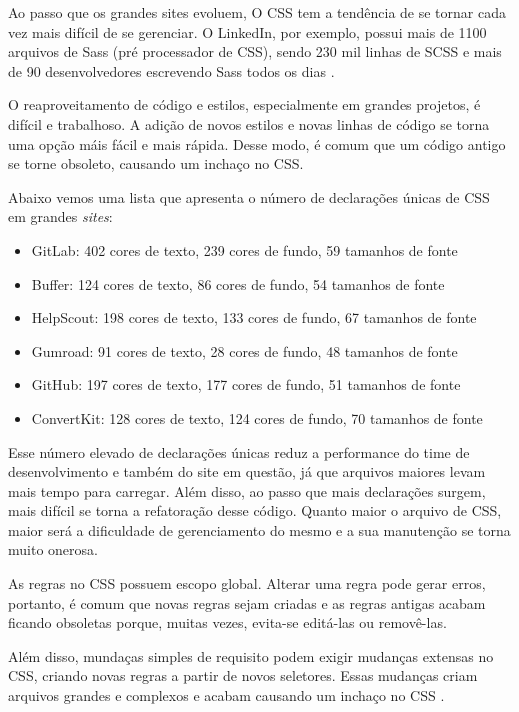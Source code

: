 Ao passo que os grandes sites evoluem, O CSS tem a tendência de se tornar cada vez mais difícil de se gerenciar. O LinkedIn, por exemplo, possui mais de 1100 arquivos de Sass
(pré processador de CSS), sendo 230 mil linhas de SCSS e mais de 90
desenvolvedores escrevendo Sass todos os dias  \cite{eppstein}.

O reaproveitamento de código e estilos, especialmente em grandes projetos, é difícil e trabalhoso. A adição de novos estilos e novas linhas de código se torna uma opção máis fácil e mais rápida. Desse modo, é comum que um código antigo se torne obsoleto, causando um inchaço no CSS.

Abaixo vemos uma lista que apresenta o número de declarações únicas de CSS em grandes \emph{sites}: \nocite{cssstats}

\begin{itemize}
\tightlist
\item
  GitLab:
  402 cores de texto, 239 cores de fundo, 59 tamanhos de fonte
\item
  Buffer:
  124 cores de texto, 86 cores de fundo, 54 tamanhos de fonte
\item
  HelpScout:
  198 cores de texto, 133 cores de fundo, 67 tamanhos de fonte
\item
  Gumroad:
  91 cores de texto, 28 cores de fundo, 48 tamanhos de fonte
\item
  GitHub:
  197 cores de texto, 177 cores de fundo, 51 tamanhos de fonte
\item
  ConvertKit:
  128 cores de texto, 124 cores de fundo, 70 tamanhos de fonte
\end{itemize}

Esse número elevado de declarações únicas reduz a performance do time de desenvolvimento e também do site em questão, já que arquivos maiores levam mais tempo para carregar. Além disso, ao passo que mais declarações surgem, mais difícil se torna a refatoração desse código. Quanto maior o arquivo de CSS, maior será a dificuldade de gerenciamento do mesmo e a sua manutenção se torna muito onerosa.

As regras no CSS possuem escopo global. Alterar uma regra pode
gerar erros, portanto, é comum que novas regras sejam criadas e as regras antigas acabam
ficando obsoletas porque, muitas vezes, evita-se editá-las ou removê-las.

Além disso, mundaças simples de requisito podem exigir mudanças extensas no
CSS, criando novas regras a partir de novos seletores. Essas mudanças criam arquivos grandes e complexos e acabam causando um inchaço no CSS \cite{koblentz}. 

